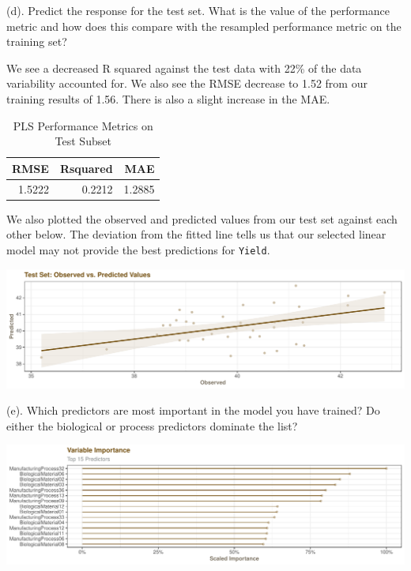 \documentclass[]{report}
\begin{document}
\begin{subquestion}{(d).} Predict the response for the test set. What is the value of the performance metric and how does this compare with the resampled performance metric on the training set? 
\end{subquestion}

We see a decreased R squared against the test data with 22\% of the data
variability accounted for. We also see the RMSE decrease to 1.52 from
our training results of 1.56. There is also a slight increase in the
MAE.

\begin{table}[H]

\caption{\label{tab:kj-6.3d-1}PLS Performance Metrics on Test Subset}
\centering
\fontsize{8}{10}\selectfont
\begin{tabular}{rrr}
\toprule
\textbf{RMSE} & \textbf{Rsquared} & \textbf{MAE}\\
\midrule
\rowcolor{gray!6}  1.5222 & 0.2212 & 1.2885\\
\bottomrule
\end{tabular}
\end{table}

We also plotted the observed and predicted values from our test set
against each other below. The deviation from the fitted line tells us
that our selected linear model may not provide the best predictions for
\texttt{Yield}.

\includegraphics{Homework-Two_files/figure-latex/kj-6.3d-2-1.pdf}

\begin{subquestion}{(e).} Which predictors are most important in the model you have trained? Do either the biological or process predictors dominate the list? 
\end{subquestion}

\includegraphics{Homework-Two_files/figure-latex/kj-6.3e-1.pdf}
\end{document}
